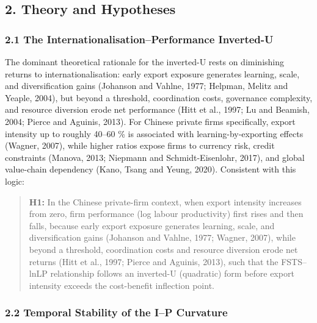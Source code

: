 \documentclass[
  12pt,a4paper]{article}
\begin{document}
\hypertarget{theory-and-hypotheses}{%
\subsection{2. Theory and Hypotheses}\label{theory-and-hypotheses}}

\hypertarget{the-internationalisationperformance-inverted-u}{%
\subsubsection{2.1 The Internationalisation--Performance
Inverted-U}\label{the-internationalisationperformance-inverted-u}}

The dominant theoretical rationale for the inverted-U rests on
diminishing returns to internationalisation: early export exposure
generates learning, scale, and diversification gains (Johanson and
Vahlne, 1977; Helpman, Melitz and Yeaple, 2004), but beyond a threshold,
coordination costs, governance complexity, and resource diversion erode
net performance (Hitt et al., 1997; Lu and Beamish, 2004; Pierce and
Aguinis, 2013). For Chinese private firms specifically, export intensity
up to roughly 40--60 \% is associated with learning-by-exporting effects
(Wagner, 2007), while higher ratios expose firms to currency risk,
credit constraints (Manova, 2013; Niepmann and Schmidt-Eisenlohr, 2017),
and global value-chain dependency (Kano, Tsang and Yeung, 2020).
Consistent with this logic:

\begin{quote}
\textbf{H1:} In the Chinese private-firm context, when export intensity
increases from zero, firm performance (log labour productivity) first
rises and then falls, because early export exposure generates learning,
scale, and diversification gains (Johanson and Vahlne, 1977; Wagner,
2007), while beyond a threshold, coordination costs and resource
diversion erode net returns (Hitt et al., 1997; Pierce and Aguinis,
2013), such that the FSTS--lnLP relationship follows an inverted-U
(quadratic) form before export intensity exceeds the cost-benefit
inflection point.
\end{quote}

\hypertarget{temporal-stability-of-the-ip-curvature}{%
\subsubsection{2.2 Temporal Stability of the I--P
Curvature}\label{temporal-stability-of-the-ip-curvature}}
\end{document}
